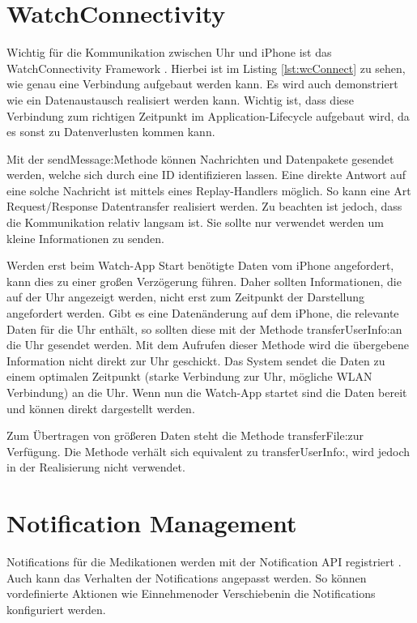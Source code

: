 \section{WatchConnectivity}
Wichtig für die Kommunikation zwischen Uhr und iPhone ist das WatchConnectivity Framework \cite{Apple:2015SharingDataToWatch}. Hierbei ist im Listing \ref{lst:wcConnect} zu sehen, wie genau eine Verbindung aufgebaut werden kann. Es wird auch demonstriert wie ein Datenaustausch realisiert werden kann. Wichtig ist, dass diese Verbindung zum richtigen Zeitpunkt im Application-Lifecycle aufgebaut wird, da es sonst zu Datenverlusten kommen kann.


 

Mit der \grqq sendMessage:\grqq  Methode können Nachrichten und Datenpakete gesendet werden, welche sich durch eine ID identifizieren lassen. Eine direkte Antwort auf eine solche Nachricht ist mittels eines Replay-Handlers möglich. So kann eine Art Request/Response Datentransfer realisiert werden. Zu beachten ist jedoch, dass die Kommunikation relativ langsam ist. Sie sollte nur verwendet werden um kleine Informationen zu senden.

Werden erst beim Watch-App Start benötigte Daten vom iPhone angefordert, kann dies zu einer großen Verzögerung führen. Daher sollten Informationen, die auf der Uhr angezeigt werden, nicht erst zum Zeitpunkt der Darstellung angefordert werden. Gibt es eine Datenänderung auf dem iPhone, die relevante Daten für die Uhr enthält, so sollten diese mit der Methode \grqq transferUserInfo:\grqq  an die Uhr gesendet werden. Mit dem Aufrufen dieser Methode wird die übergebene Information nicht direkt zur Uhr geschickt. Das System sendet die Daten zu einem optimalen Zeitpunkt (starke Verbindung zur Uhr, mögliche WLAN Verbindung) an die Uhr. Wenn nun die Watch-App startet sind die Daten bereit und können direkt dargestellt werden.

Zum Übertragen von größeren Daten steht die Methode \grqq transferFile:\grqq zur Verfügung. Die Methode verhält sich equivalent zu \grqq transferUserInfo:\grqq, wird jedoch in der Realisierung nicht verwendet.

\section{Notification Management}
Notifications für die Medikationen werden mit der Notification API  registriert \cite{Apple:2015notif}. Auch kann das Verhalten der Notifications angepasst werden. So können vordefinierte Aktionen wie \glqq Einnehmen\grqq  oder \glqq Verschieben\grqq in die Notifications konfiguriert werden.

